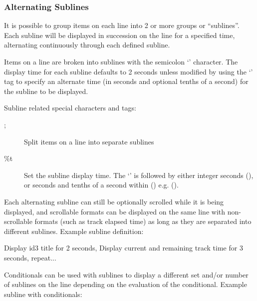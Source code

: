 \subsubsection{\label{ref:AlternatingSublines}Alternating Sublines}

It is possible to group items on each line into 2 or more groups or
``sublines''. Each subline will be displayed in succession on the line for a
specified time, alternating continuously through each defined subline.

Items on a line are broken into sublines with the semicolon
`\config{;}' character. The display time for
each subline defaults to 2 seconds unless modified by using the
`' tag to specify an alternate
time (in seconds and optional tenths of a second) for the subline to be
displayed.

Subline related special characters and tags:
\begin{description}
\item[;] Split items on a line into separate sublines
\item[\%t] Set the subline display time. The
`' is followed by either integer seconds (), or seconds
and tenths of a second within () e.g. ().
\end{description}

Each alternating subline can still be optionally scrolled while it is
being displayed, and scrollable formats can be displayed on the same
line with non{}-scrollable formats (such as track elapsed time) as long
as they are separated into different sublines.
Example subline definition:
\begin{example}
                                 Display id3 title for 2 seconds,
                                 Display current and remaining track time
                                 for 3 seconds,
                                 repeat...
\end{example}

Conditionals can be used with sublines to display a different set and/or number
of sublines on the line depending on the evaluation of the conditional.
Example subline with conditionals:
\begin{example}
\end{example}

